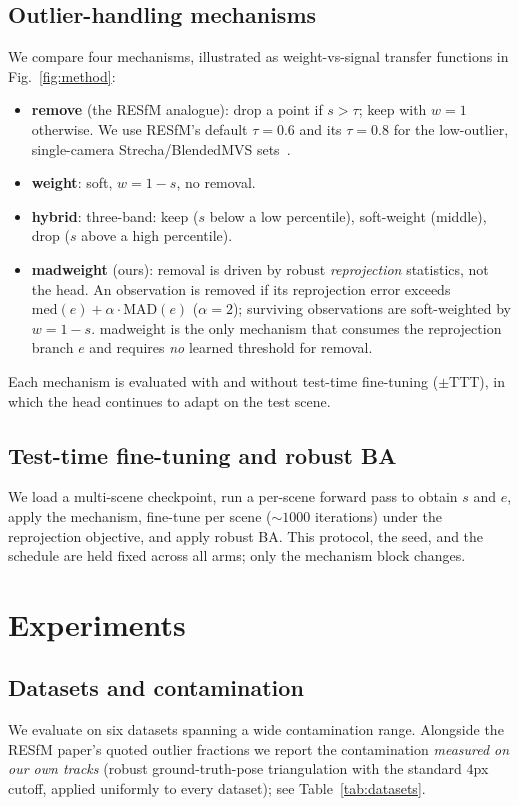 \documentclass{article}
\newcommand{\mad}{madweight}
\begin{document}
\subsection{Outlier-handling mechanisms}
We compare four mechanisms, illustrated as weight-vs-signal transfer functions in
Fig.~\ref{fig:method}:
\begin{itemize}\itemsep2pt
\item\textbf{remove} (the RESfM analogue): drop a point if $s>\tau$; keep with $w{=}1$
otherwise. We use RESfM's default $\tau{=}0.6$ and its $\tau{=}0.8$ for the low-outlier,
single-camera Strecha/BlendedMVS sets~\citep{resfm}.
\item\textbf{weight}: soft, $w=1-s$, no removal.
\item\textbf{hybrid}: three-band: keep ($s$ below a low percentile), soft-weight (middle),
drop ($s$ above a high percentile).
\item\textbf{\mad{}} (ours): removal is driven by robust \emph{reprojection} statistics, not
the head. An observation is removed if its reprojection error exceeds
$\mathrm{med}(e)+\alpha\cdot\mathrm{MAD}(e)$ ($\alpha{=}2$); surviving observations are
soft-weighted by $w=1-s$. \mad{} is the only mechanism that consumes the reprojection
branch $e$ and requires \emph{no} learned threshold for removal.
\end{itemize}
Each mechanism is evaluated with and without test-time fine-tuning ($\pm$TTT), in which the
head continues to adapt on the test scene.

\subsection{Test-time fine-tuning and robust BA}
We load a multi-scene checkpoint, run a per-scene forward pass to obtain $s$ and $e$, apply
the mechanism, fine-tune per scene ($\sim\!1000$ iterations) under the reprojection
objective, and apply robust BA. This protocol, the seed, and the schedule are held fixed
across all arms; only the mechanism block changes.

\section{Experiments}
\subsection{Datasets and contamination}
We evaluate on six datasets spanning a wide contamination range. Alongside the RESfM
paper's quoted outlier fractions we report the contamination \emph{measured on our own
tracks} (robust ground-truth-pose triangulation with the standard $4$px cutoff, applied
uniformly to every dataset); see Table~\ref{tab:datasets}.
\end{document}

